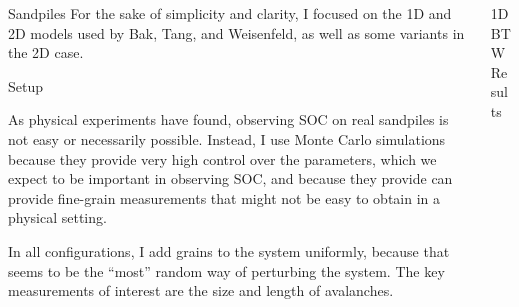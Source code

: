\documentclass[final]{beamer}
\newlength{\onecolwid}
\begin{document}
\begin{frame}[t]
\begin{columns}[t]
\begin{column}{\onecolwid}
\begin{block}{Sandpiles}
For the sake of simplicity and clarity, I focused on the 1D and 2D models used by Bak, Tang, and Weisenfeld, as well as some variants in the 2D case.

\end{block}


\begin{block}{Setup}

As physical experiments have found, observing SOC on real sandpiles is not easy or necessarily possible. Instead, I use Monte Carlo simulations because they provide very high control over the parameters, which we expect to be important in observing SOC, and because they provide can provide fine-grain measurements that might not be easy to obtain in a physical setting.

In all configurations, I add grains to the system uniformly, because that seems to be the ``most'' random way of perturbing the system. The key measurements of interest are the size and length of avalanches. 


\end{block}


\end{column} %





\begin{column}{\onecolwid} %


\begin{block}{1D BTW Results}


\end{block}




\end{column}
\end{columns}
\end{frame}
\end{document}
